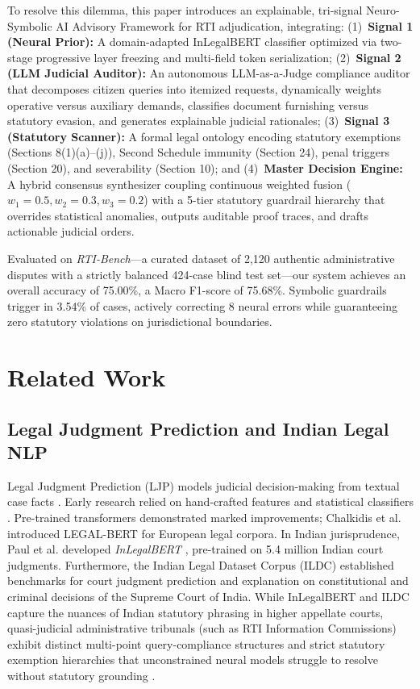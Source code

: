 \documentclass[conference]{IEEEtran}
\begin{document}
To resolve this dilemma, this paper introduces an explainable, tri-signal Neuro-Symbolic AI Advisory Framework for RTI adjudication, integrating:
(1)~\textbf{Signal 1 (Neural Prior):} A domain-adapted InLegalBERT classifier optimized via two-stage progressive layer freezing and multi-field token serialization;
(2)~\textbf{Signal 2 (LLM Judicial Auditor):} An autonomous LLM-as-a-Judge compliance auditor that decomposes citizen queries into itemized requests, dynamically weights operative versus auxiliary demands, classifies document furnishing versus statutory evasion, and generates explainable judicial rationales;
(3)~\textbf{Signal 3 (Statutory Scanner):} A formal legal ontology encoding statutory exemptions (Sections 8(1)(a)--(j)), Second Schedule immunity (Section 24), penal triggers (Section 20), and severability (Section 10); and
(4)~\textbf{Master Decision Engine:} A hybrid consensus synthesizer coupling continuous weighted fusion ($w_1=0.5, w_2=0.3, w_3=0.2$) with a 5-tier statutory guardrail hierarchy that overrides statistical anomalies, outputs auditable proof traces, and drafts actionable judicial orders.

Evaluated on \textit{RTI-Bench}---a curated dataset of 2,120 authentic administrative disputes with a strictly balanced 424-case blind test set---our system achieves an overall accuracy of 75.00\%, a Macro F1-score of 75.68\%. Symbolic guardrails trigger in 3.54\% of cases, actively correcting 8 neural errors while guaranteeing zero statutory violations on jurisdictional boundaries.

\section{Related Work}
\subsection{Legal Judgment Prediction and Indian Legal NLP}
Legal Judgment Prediction (LJP) models judicial decision-making from textual case facts \cite{zhong2020nlp}. Early research relied on hand-crafted features and statistical classifiers \cite{katz2017general, medvedeva2020using}. Pre-trained transformers demonstrated marked improvements; Chalkidis et al. introduced LEGAL-BERT \cite{chalkidis2020legalbert} for European legal corpora. In Indian jurisprudence, Paul et al. developed \textit{InLegalBERT} \cite{paul2023pre}, pre-trained on 5.4 million Indian court judgments. Furthermore, the Indian Legal Dataset Corpus (ILDC) \cite{malik2021ildc} established benchmarks for court judgment prediction and explanation on constitutional and criminal decisions of the Supreme Court of India. While InLegalBERT and ILDC capture the nuances of Indian statutory phrasing in higher appellate courts, quasi-judicial administrative tribunals (such as RTI Information Commissions) exhibit distinct multi-point query-compliance structures and strict statutory exemption hierarchies that unconstrained neural models struggle to resolve without statutory grounding \cite{hu2020few}.
\end{document}

